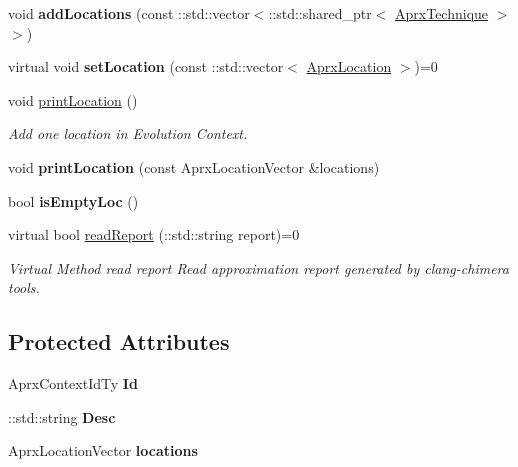 \begin{DoxyCompactItemize}
void {\bfseries add\+Locations} (const \+::std\+::vector$<$\+::std\+::shared\+\_\+ptr$<$ \hyperlink{classbellerophon_1_1core_1_1AprxTechnique}{Aprx\+Technique} $>$$>$)
\item 
\hypertarget{classbellerophon_1_1core_1_1AprxContext_a0e7fcc06eb0b29d4196c2618b2d9f039}{}\label{classbellerophon_1_1core_1_1AprxContext_a0e7fcc06eb0b29d4196c2618b2d9f039} 
virtual void {\bfseries set\+Location} (const \+::std\+::vector$<$ \hyperlink{structbellerophon_1_1core_1_1AprxLocation}{Aprx\+Location} $>$)=0
\item 
void \hyperlink{classbellerophon_1_1core_1_1AprxContext_a3cbee10e05f6ef709f3663f2befff2db}{print\+Location} ()
\begin{DoxyCompactList}\small\item\em Add one location in Evolution Context. \end{DoxyCompactList}\item 
\hypertarget{classbellerophon_1_1core_1_1AprxContext_ae162fdaa857732bcf4f301e74bab102e}{}\label{classbellerophon_1_1core_1_1AprxContext_ae162fdaa857732bcf4f301e74bab102e} 
void {\bfseries print\+Location} (const Aprx\+Location\+Vector \&locations)
\item 
\hypertarget{classbellerophon_1_1core_1_1AprxContext_a27fa36a512613474ce79cf511ada6ad7}{}\label{classbellerophon_1_1core_1_1AprxContext_a27fa36a512613474ce79cf511ada6ad7} 
bool {\bfseries is\+Empty\+Loc} ()
\item 
virtual bool \hyperlink{classbellerophon_1_1core_1_1AprxContext_a6f7863e6f7d7146807247dca43a5af28}{read\+Report} (\+::std\+::string report)=0
\begin{DoxyCompactList}\small\item\em Virtual Method read report  Read approximation report generated by clang-\/chimera tools. \end{DoxyCompactList}\end{DoxyCompactItemize}
\subsection*{Protected Attributes}
\begin{DoxyCompactItemize}
\item 
\hypertarget{classbellerophon_1_1core_1_1AprxContext_a36cf8457115e90400323c0a248f0262e}{}\label{classbellerophon_1_1core_1_1AprxContext_a36cf8457115e90400323c0a248f0262e} 
Aprx\+Context\+Id\+Ty {\bfseries Id}
\item 
\hypertarget{classbellerophon_1_1core_1_1AprxContext_aef60cb2bc6d790594e34b56c526c8785}{}\label{classbellerophon_1_1core_1_1AprxContext_aef60cb2bc6d790594e34b56c526c8785} 
\+::std\+::string {\bfseries Desc}
\item 
\hypertarget{classbellerophon_1_1core_1_1AprxContext_aa41f847aae1a8673d11549aa8edcb89c}{}\label{classbellerophon_1_1core_1_1AprxContext_aa41f847aae1a8673d11549aa8edcb89c} 
Aprx\+Location\+Vector {\bfseries locations}
\end{DoxyCompactItemize}


